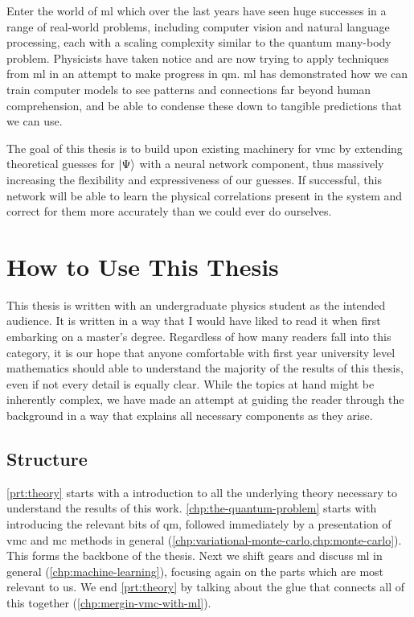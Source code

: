 \documentclass[Thesis.tex]{subfiles}
\begin{document}
Enter the world of \gls{ml} which over the last years have seen
huge successes in a range of real-world problems, including computer vision and
natural language processing, each with a scaling complexity similar to
the quantum many-body problem. Physicists have taken notice and are now trying
to apply techniques from \gls{ml} in an attempt to make progress in \gls{qm}. \Acrlong{ml} has
demonstrated how we can train computer models to see patterns and connections
far beyond human comprehension, and be able to condense these down to tangible
predictions that we can use.

The goal of this thesis is to build upon existing machinery for \gls{vmc} by extending
theoretical guesses for $| \Psi \rangle$ with a neural network component, thus massively
increasing the flexibility and expressiveness of our guesses. If successful, this
network will be able to learn the physical correlations present in the system
and correct for them more accurately than we could ever do ourselves.



\section*{How to Use This Thesis}

This thesis is written with an undergraduate physics student as the intended
audience. It is written in a way that I would have liked to read it when first
embarking on a master's degree. Regardless of how many readers fall into this
category, it is our hope that anyone comfortable with first year university
level mathematics should able to understand the majority of the results of this
thesis, even if not every detail is equally clear. While the topics at hand might be
inherently complex, we have made an attempt at guiding the reader through the
background in a way that explains all necessary components as they arise.


\subsection*{Structure}
\cref{prt:theory} starts with a introduction to all the underlying theory
necessary to understand the results of this work. \cref{chp:the-quantum-problem}
starts with introducing the relevant bits of \acrlong{qm}, followed
immediately by a presentation of \acrlong{vmc} and \acrlong{mc} methods
in general (\cref{chp:variational-monte-carlo,chp:monte-carlo}). This forms the
backbone of the thesis. Next we shift gears and discuss \acrlong{ml} in
general (\cref{chp:machine-learning}), focusing again on the parts which are
most relevant to us. We end \cref{prt:theory} by talking about the glue that
connects all of this together (\cref{chp:mergin-vmc-with-ml}).
\end{document}
